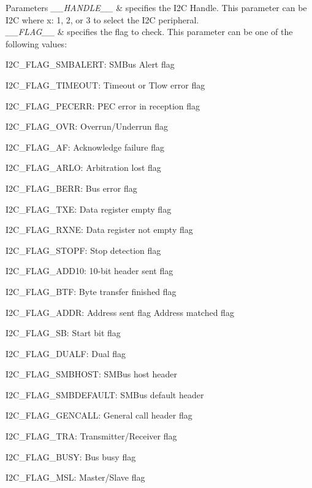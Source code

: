\begin{DoxyParams}{Parameters}
{\em \+\_\+\+\_\+\+H\+A\+N\+D\+L\+E\+\_\+\+\_\+} & specifies the I2C Handle. This parameter can be I2C where x\+: 1, 2, or 3 to select the I2C peripheral. \\
\hline
{\em \+\_\+\+\_\+\+F\+L\+A\+G\+\_\+\+\_\+} & specifies the flag to check. This parameter can be one of the following values\+: \begin{DoxyItemize}
\item I2\+C\+\_\+\+F\+L\+A\+G\+\_\+\+S\+M\+B\+A\+L\+E\+RT\+: S\+M\+Bus Alert flag \item I2\+C\+\_\+\+F\+L\+A\+G\+\_\+\+T\+I\+M\+E\+O\+UT\+: Timeout or Tlow error flag \item I2\+C\+\_\+\+F\+L\+A\+G\+\_\+\+P\+E\+C\+E\+RR\+: P\+EC error in reception flag \item I2\+C\+\_\+\+F\+L\+A\+G\+\_\+\+O\+VR\+: Overrun/\+Underrun flag \item I2\+C\+\_\+\+F\+L\+A\+G\+\_\+\+AF\+: Acknowledge failure flag \item I2\+C\+\_\+\+F\+L\+A\+G\+\_\+\+A\+R\+LO\+: Arbitration lost flag \item I2\+C\+\_\+\+F\+L\+A\+G\+\_\+\+B\+E\+RR\+: Bus error flag \item I2\+C\+\_\+\+F\+L\+A\+G\+\_\+\+T\+XE\+: Data register empty flag \item I2\+C\+\_\+\+F\+L\+A\+G\+\_\+\+R\+X\+NE\+: Data register not empty flag \item I2\+C\+\_\+\+F\+L\+A\+G\+\_\+\+S\+T\+O\+PF\+: Stop detection flag \item I2\+C\+\_\+\+F\+L\+A\+G\+\_\+\+A\+D\+D10\+: 10-\/bit header sent flag \item I2\+C\+\_\+\+F\+L\+A\+G\+\_\+\+B\+TF\+: Byte transfer finished flag \item I2\+C\+\_\+\+F\+L\+A\+G\+\_\+\+A\+D\+DR\+: Address sent flag Address matched flag \item I2\+C\+\_\+\+F\+L\+A\+G\+\_\+\+SB\+: Start bit flag \item I2\+C\+\_\+\+F\+L\+A\+G\+\_\+\+D\+U\+A\+LF\+: Dual flag \item I2\+C\+\_\+\+F\+L\+A\+G\+\_\+\+S\+M\+B\+H\+O\+ST\+: S\+M\+Bus host header \item I2\+C\+\_\+\+F\+L\+A\+G\+\_\+\+S\+M\+B\+D\+E\+F\+A\+U\+LT\+: S\+M\+Bus default header \item I2\+C\+\_\+\+F\+L\+A\+G\+\_\+\+G\+E\+N\+C\+A\+LL\+: General call header flag \item I2\+C\+\_\+\+F\+L\+A\+G\+\_\+\+T\+RA\+: Transmitter/\+Receiver flag \item I2\+C\+\_\+\+F\+L\+A\+G\+\_\+\+B\+U\+SY\+: Bus busy flag \item I2\+C\+\_\+\+F\+L\+A\+G\+\_\+\+M\+SL\+: Master/\+Slave flag \end{DoxyItemize}
\\
\hline
\end{DoxyParams}

